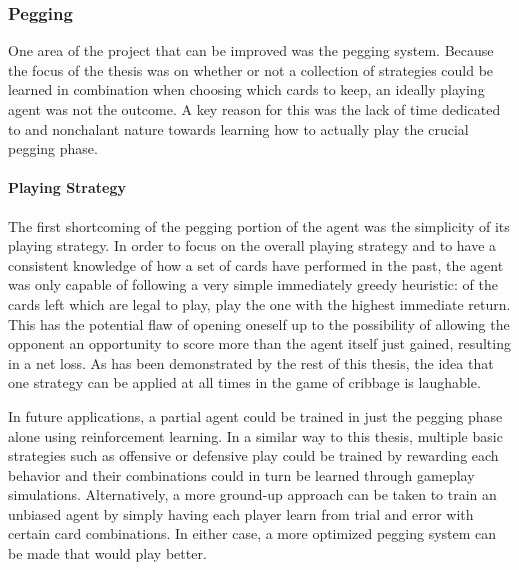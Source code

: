 
\subsubsection*{Pegging}
\label{sec:disc-future-pegging}



One area of the project that can be improved was the pegging system.
%
Because the focus of the thesis was on whether or not a collection of
strategies could be learned in combination when choosing which cards to keep,
an ideally playing agent was not the outcome.
%
A key reason for this was the lack of time dedicated to and nonchalant nature
towards learning how to actually play the crucial pegging phase.

\paragraph*{Playing Strategy}


The first shortcoming of the pegging portion of the agent was the simplicity
of its playing strategy.
%
In order to focus on the overall playing strategy and to have a consistent
knowledge of how a set of cards have performed in the past,
the agent was only capable of following a very simple immediately greedy 
heuristic:
of the cards left which are legal to play,
play the one with the highest immediate return.
%
This has the potential flaw of
opening oneself up to the possibility of allowing the opponent an opportunity
to score more than the agent itself just gained,
resulting in a net loss.
%
As has been demonstrated by the rest of this thesis,
the idea that one strategy can be applied at all times in the game of cribbage
is laughable.

In future applications,
a partial agent could be trained in just the pegging phase alone
using reinforcement learning.
%
In a similar way to this thesis,
multiple basic strategies such as offensive or defensive play
could be trained by rewarding each behavior and their combinations
could in turn be learned through gameplay simulations.
%
Alternatively,
a more ground-up approach can be taken to train an unbiased agent by simply
having each player learn from trial and error with certain card combinations.
%
%
In either case,
a more optimized pegging system can be made that would play better.


